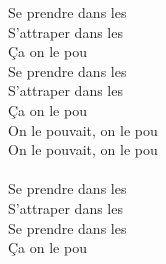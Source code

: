   \songwordfb{} \songwordfb{} \songwordfb{}
Se prendre dans les  \\
S’attraper dans les  \\
Ça on le pou \\
Se prendre dans les  \\
S’attraper dans les  \\
Ça on le pou \\
On le pouvait, on le pou \\
On le pouvait, on le pou \\
\color{cyan}{( un monde nouveau )} \\
Se prendre dans les  \\
S’attraper dans les  \\
Se prendre dans les  \\
Ça on le pou 
